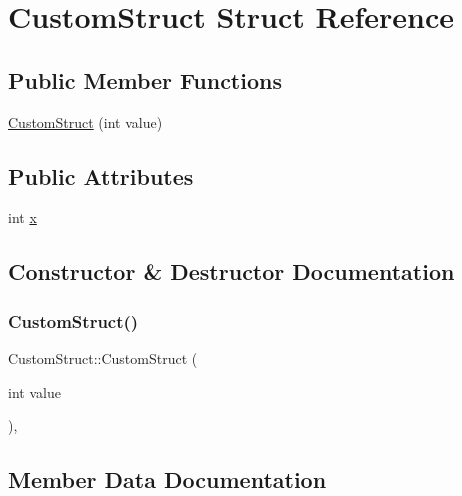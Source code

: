 \hypertarget{structCustomStruct}{}\section{Custom\+Struct Struct Reference}
\label{structCustomStruct}
\subsection*{Public Member Functions}
\begin{DoxyCompactItemize}
\item 
\mbox{\hyperlink{structCustomStruct_aeab194957ba9e056e81c721e83c61941}{Custom\+Struct}} (int value)
\end{DoxyCompactItemize}
\subsection*{Public Attributes}
\begin{DoxyCompactItemize}
\item 
int \mbox{\hyperlink{structCustomStruct_a436b0c2ffdab1f711fa40cfa3e246602}{x}}
\end{DoxyCompactItemize}


\subsection{Constructor \& Destructor Documentation}
\mbox{\label{structCustomStruct_aeab194957ba9e056e81c721e83c61941}} 
\subsubsection{\texorpdfstring{CustomStruct()}{CustomStruct()}}
{\footnotesize\ttfamily Custom\+Struct\+::\+Custom\+Struct (\begin{DoxyParamCaption}\item[{int}]{value }\end{DoxyParamCaption})\hspace{0.3cm}{\ttfamily [inline]}, {\ttfamily [explicit]}}



\subsection{Member Data Documentation}
\mbox{\label{structCustomStruct_a436b0c2ffdab1f711fa40cfa3e246602}} 
